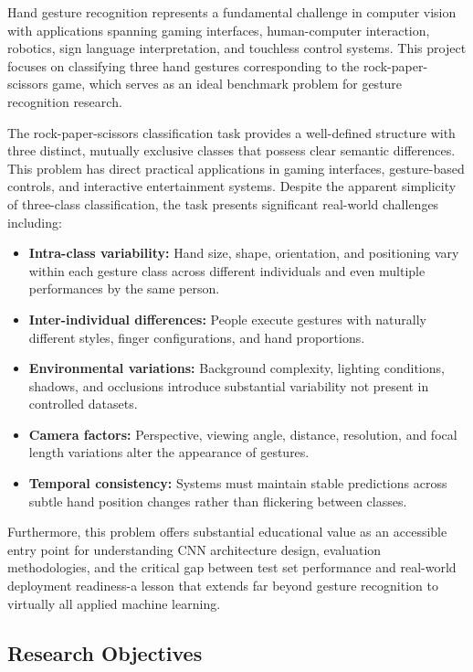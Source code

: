 \documentclass[12pt,a4paper]{article}
\begin{document}
Hand gesture recognition represents a fundamental challenge in computer vision with applications spanning gaming interfaces, human-computer interaction, robotics, sign language interpretation, and touchless control systems. This project focuses on classifying three hand gestures corresponding to the rock-paper-scissors game, which serves as an ideal benchmark problem for gesture recognition research.

The rock-paper-scissors classification task provides a well-defined structure with three distinct, mutually exclusive classes that possess clear semantic differences. This problem has direct practical applications in gaming interfaces, gesture-based controls, and interactive entertainment systems. Despite the apparent simplicity of three-class classification, the task presents significant real-world challenges including:

\begin{itemize}
    \item \textbf{Intra-class variability:} Hand size, shape, orientation, and positioning vary within each gesture class across different individuals and even multiple performances by the same person.
    \item \textbf{Inter-individual differences:} People execute gestures with naturally different styles, finger configurations, and hand proportions.
    \item \textbf{Environmental variations:} Background complexity, lighting conditions, shadows, and occlusions introduce substantial variability not present in controlled datasets.
    \item \textbf{Camera factors:} Perspective, viewing angle, distance, resolution, and focal length variations alter the appearance of gestures.
    \item \textbf{Temporal consistency:} Systems must maintain stable predictions across subtle hand position changes rather than flickering between classes.
\end{itemize}

Furthermore, this problem offers substantial educational value as an accessible entry point for understanding CNN architecture design, evaluation methodologies, and the critical gap between test set performance and real-world deployment readiness-a lesson that extends far beyond gesture recognition to virtually all applied machine learning.

\subsection{Research Objectives}
\end{document}
